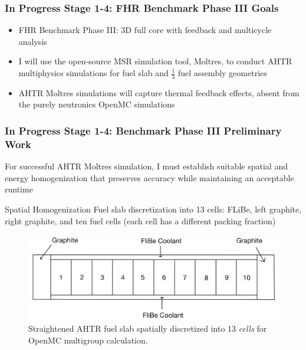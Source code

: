 \begin{frame}
    \frametitle{In Progress Stage 1-4: FHR Benchmark Phase III Goals}
    \begin{itemize}
        \item FHR Benchmark Phase III: 3D full core with feedback and multicycle 
        analysis
        \item I will use the open-source MSR simulation tool, Moltres, to conduct
        AHTR multiphysics simulations for fuel slab and $\frac{1}{3}$
        fuel assembly geometries 
        \item AHTR Moltres simulations will capture thermal feedback effects, 
        absent from the purely neutronics OpenMC simulations
    \end{itemize}
\end{frame}

\begin{frame}
    \frametitle{In Progress Stage 1-4: Benchmark Phase III Preliminary Work}
    For successful AHTR Moltres simulation, I must establish 
    suitable spatial and energy homogenization that preserves accuracy while 
    maintaining an acceptable runtime
\begin{block}{Spatial Homogenization}
    Fuel slab discretization into 13 cells: FLiBe, left graphite, right graphite, 
    and ten fuel cells (each cell has a different packing fraction)
\end{block}
\begin{figure}[]
    \includegraphics[width=0.8\linewidth]{figures/straightened_slab_mg.png}
    \caption{Straightened AHTR fuel slab spatially discretized into 
    13 \textit{cells} for OpenMC multigroup calculation.}
\end{figure}
\end{frame}

